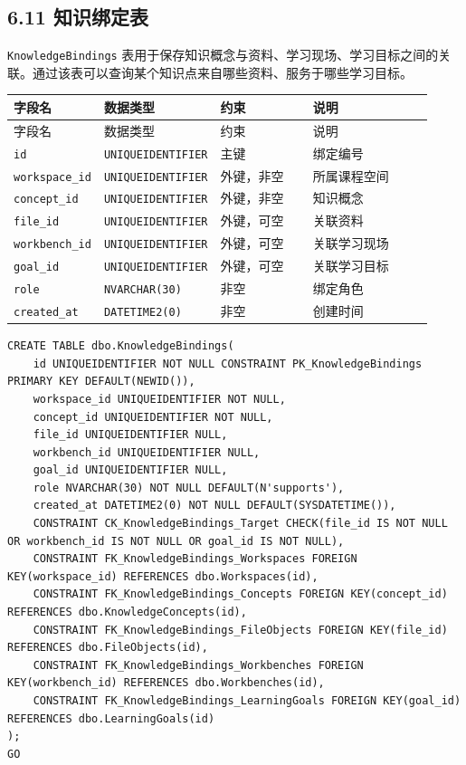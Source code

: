 \documentclass[10pt,a4paper,fontset=none]{ctexart}
\begin{document}
\subsection*{6.11 知识绑定表}

\texttt{KnowledgeBindings} 表用于保存知识概念与资料、学习现场、学习目标之间的关联。通过该表可以查询某个知识点来自哪些资料、服务于哪些学习目标。\par

\begingroup\scriptsize
\renewcommand{\arraystretch}{1.18}
\setlength{\LTleft}{0pt}
\setlength{\LTright}{0pt}
\begin{longtable}{>{\raggedright\arraybackslash}p{0.20\linewidth}>{\raggedright\arraybackslash}p{0.16\linewidth}>{\raggedright\arraybackslash}p{0.24\linewidth}>{\raggedright\arraybackslash}p{0.32\linewidth}}
\toprule
字段名 & 数据类型 & 约束 & 说明 \\
\midrule
\endfirsthead
\toprule
字段名 & 数据类型 & 约束 & 说明 \\
\midrule
\endhead
\texttt{id} & \texttt{UNIQUEIDENTIFIER} & 主键 & 绑定编号 \\
\texttt{workspace\_id} & \texttt{UNIQUEIDENTIFIER} & 外键，非空 & 所属课程空间 \\
\texttt{concept\_id} & \texttt{UNIQUEIDENTIFIER} & 外键，非空 & 知识概念 \\
\texttt{file\_id} & \texttt{UNIQUEIDENTIFIER} & 外键，可空 & 关联资料 \\
\texttt{workbench\_id} & \texttt{UNIQUEIDENTIFIER} & 外键，可空 & 关联学习现场 \\
\texttt{goal\_id} & \texttt{UNIQUEIDENTIFIER} & 外键，可空 & 关联学习目标 \\
\texttt{role} & \texttt{NVARCHAR(30)} & 非空 & 绑定角色 \\
\texttt{created\_at} & \texttt{DATETIME2(0)} & 非空 & 创建时间 \\
\bottomrule
\end{longtable}
\endgroup


\begin{Verbatim}[fontsize=\scriptsize,frame=single]
CREATE TABLE dbo.KnowledgeBindings(
    id UNIQUEIDENTIFIER NOT NULL CONSTRAINT PK_KnowledgeBindings PRIMARY KEY DEFAULT(NEWID()),
    workspace_id UNIQUEIDENTIFIER NOT NULL,
    concept_id UNIQUEIDENTIFIER NOT NULL,
    file_id UNIQUEIDENTIFIER NULL,
    workbench_id UNIQUEIDENTIFIER NULL,
    goal_id UNIQUEIDENTIFIER NULL,
    role NVARCHAR(30) NOT NULL DEFAULT(N'supports'),
    created_at DATETIME2(0) NOT NULL DEFAULT(SYSDATETIME()),
    CONSTRAINT CK_KnowledgeBindings_Target CHECK(file_id IS NOT NULL OR workbench_id IS NOT NULL OR goal_id IS NOT NULL),
    CONSTRAINT FK_KnowledgeBindings_Workspaces FOREIGN KEY(workspace_id) REFERENCES dbo.Workspaces(id),
    CONSTRAINT FK_KnowledgeBindings_Concepts FOREIGN KEY(concept_id) REFERENCES dbo.KnowledgeConcepts(id),
    CONSTRAINT FK_KnowledgeBindings_FileObjects FOREIGN KEY(file_id) REFERENCES dbo.FileObjects(id),
    CONSTRAINT FK_KnowledgeBindings_Workbenches FOREIGN KEY(workbench_id) REFERENCES dbo.Workbenches(id),
    CONSTRAINT FK_KnowledgeBindings_LearningGoals FOREIGN KEY(goal_id) REFERENCES dbo.LearningGoals(id)
);
GO
\end{Verbatim}
\end{document}
